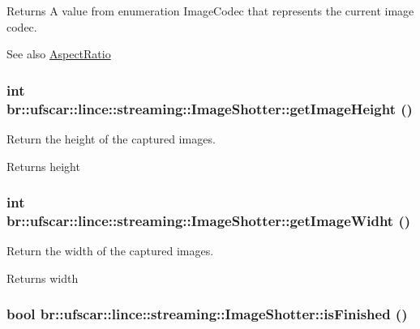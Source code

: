 \begin{DoxyReturn}{Returns}
A value from enumeration ImageCodec that represents the current image codec. 
\end{DoxyReturn}
\begin{DoxySeeAlso}{See also}
\hyperlink{namespacebr_1_1ufscar_1_1lince_1_1streaming_a4b30a3170430e0fc8bacd10d9c602bb8}{AspectRatio} 
\end{DoxySeeAlso}
\hypertarget{classbr_1_1ufscar_1_1lince_1_1streaming_1_1ImageShotter_a62c43a5a2cc5052cbb5c12e5b7678696}{
\subsubsection[{getImageHeight}]{\setlength{\rightskip}{0pt plus 5cm}int br::ufscar::lince::streaming::ImageShotter::getImageHeight ()}}
\label{classbr_1_1ufscar_1_1lince_1_1streaming_1_1ImageShotter_a62c43a5a2cc5052cbb5c12e5b7678696}


Return the height of the captured images. 

\begin{DoxyReturn}{Returns}
height 
\end{DoxyReturn}
\hypertarget{classbr_1_1ufscar_1_1lince_1_1streaming_1_1ImageShotter_a68bcdd3106b8031bd7db5850622a9c33}{
\subsubsection[{getImageWidht}]{\setlength{\rightskip}{0pt plus 5cm}int br::ufscar::lince::streaming::ImageShotter::getImageWidht ()}}
\label{classbr_1_1ufscar_1_1lince_1_1streaming_1_1ImageShotter_a68bcdd3106b8031bd7db5850622a9c33}


Return the width of the captured images. 

\begin{DoxyReturn}{Returns}
width 
\end{DoxyReturn}
\hypertarget{classbr_1_1ufscar_1_1lince_1_1streaming_1_1ImageShotter_af48a5173662f7dea91dc8140f5e501cc}{
\subsubsection[{isFinished}]{\setlength{\rightskip}{0pt plus 5cm}bool br::ufscar::lince::streaming::ImageShotter::isFinished ()}}
\label{classbr_1_1ufscar_1_1lince_1_1streaming_1_1ImageShotter_af48a5173662f7dea91dc8140f5e501cc}


